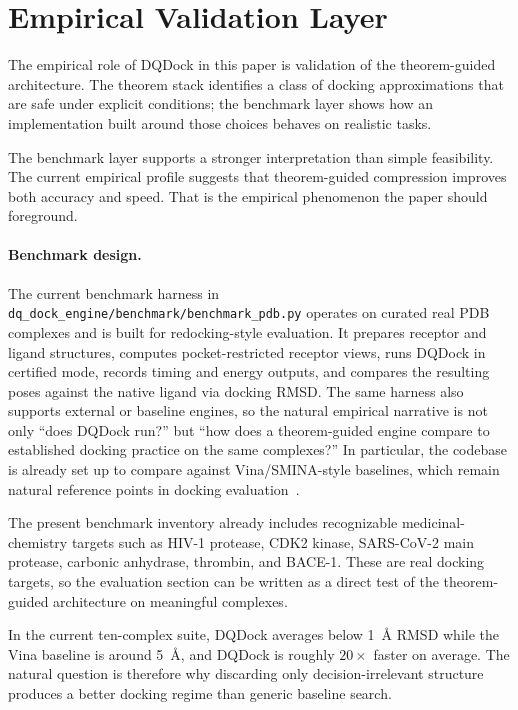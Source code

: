 \section{Empirical Validation Layer}\label{sec:evaluation}

The empirical role of DQDock in this paper is validation of the theorem-guided architecture. The theorem stack identifies a class of docking approximations that are safe under explicit conditions; the benchmark layer shows how an implementation built around those choices behaves on realistic tasks.

The benchmark layer supports a stronger interpretation than simple feasibility. The current empirical profile suggests that theorem-guided compression improves both accuracy and speed. That is the empirical phenomenon the paper should foreground.

\paragraph{Benchmark design.}
The current benchmark harness in \texttt{dq\_dock\_engine/benchmark/benchmark\_pdb.py} operates on curated real PDB complexes and is built for redocking-style evaluation. It prepares receptor and ligand structures, computes pocket-restricted receptor views, runs DQDock in certified mode, records timing and energy outputs, and compares the resulting poses against the native ligand via docking RMSD. The same harness also supports external or baseline engines, so the natural empirical narrative is not only ``does DQDock run?'' but ``how does a theorem-guided engine compare to established docking practice on the same complexes?'' In particular, the codebase is already set up to compare against Vina/SMINA-style baselines, which remain natural reference points in docking evaluation~\cite{trott2010autodock,koes2013smina}.

The present benchmark inventory already includes recognizable medicinal-chemistry targets such as HIV-1 protease, CDK2 kinase, SARS-CoV-2 main protease, carbonic anhydrase, thrombin, and BACE-1. These are real docking targets, so the evaluation section can be written as a direct test of the theorem-guided architecture on meaningful complexes.

In the current ten-complex suite, DQDock averages below 1~\AA{} RMSD while the Vina baseline is around 5~\AA{}, and DQDock is roughly $20\times$ faster on average. The natural question is therefore why discarding only decision-irrelevant structure produces a better docking regime than generic baseline search.

